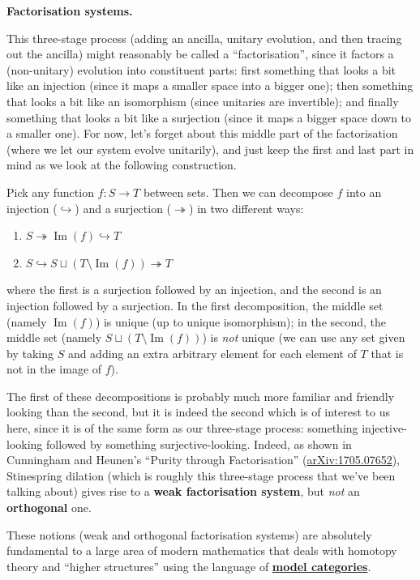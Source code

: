 \documentclass[fleqn,a4paper]{article}
\providecommand{\tightlist}{\setlength{\itemsep}{0pt}\setlength{\parskip}{0pt}}
\newenvironment{technical}[1]{\textbf{#1.}\par\vspace{.5\baselineskip}\everypar{\setlength{\parindent}{1.5em}}}{}
\theoremstyle{definition}
\theoremstyle{definition}
\theoremstyle{definition}
\theoremstyle{definition}
\theoremstyle{remark}
\begin{document}
\begin{technical}{Factorisation systems}
This three-stage process (adding an ancilla, unitary evolution, and then tracing out the ancilla) might reasonably be called a ``factorisation'', since it factors a (non-unitary) evolution into constituent parts: first something that looks a bit like an injection (since it maps a smaller space into a bigger one); then something that looks a bit like an isomorphism (since unitaries are invertible); and finally something that looks a bit like a surjection (since it maps a bigger space down to a smaller one).
For now, let's forget about this middle part of the factorisation (where we let our system evolve unitarily), and just keep the first and last part in mind as we look at the following construction.

Pick any function \(f\colon S\to T\) between sets.
Then we can decompose \(f\) into an injection (\(\hookrightarrow\)) and a surjection (\(\twoheadrightarrow\)) in two different ways:

\begin{enumerate}
\def\labelenumi{\arabic{enumi}.}
\tightlist
\item
  \(S\twoheadrightarrow\operatorname{Im}(f)\hookrightarrow T\)
\item
  \(S\hookrightarrow S\sqcup(T\setminus\operatorname{Im}(f))\twoheadrightarrow T\)
\end{enumerate}

where the first is a surjection followed by an injection, and the second is an injection followed by a surjection.
In the first decomposition, the middle set (namely \(\operatorname{Im}(f)\)) is unique (up to unique isomorphism); in the second, the middle set (namely \(S\sqcup(T\setminus\operatorname{Im}(f))\)) is \emph{not} unique (we can use any set given by taking \(S\) and adding an extra arbitrary element for each element of \(T\) that is not in the image of \(f\)).

The first of these decompositions is probably much more familiar and friendly looking than the second, but it is indeed the second which is of interest to us here, since it is of the same form as our three-stage process: something injective-looking followed by something surjective-looking.
Indeed, as shown in Cunningham and Heunen's ``Purity through Factorisation'' (\href{https://arxiv.org/abs/1705.07652}{arXiv:1705.07652}), Stinespring dilation (which is roughly this three-stage process that we've been talking about) gives rise to a \textbf{weak factorisation system}, but \emph{not} an \textbf{orthogonal} one.

These notions (weak and orthogonal factorisation systems) are absolutely fundamental to a large area of modern mathematics that deals with homotopy theory and ``higher structures'' using the language of \href{https://en.wikipedia.org/wiki/Model_category}{\textbf{model categories}}.

\end{technical}
\end{document}
